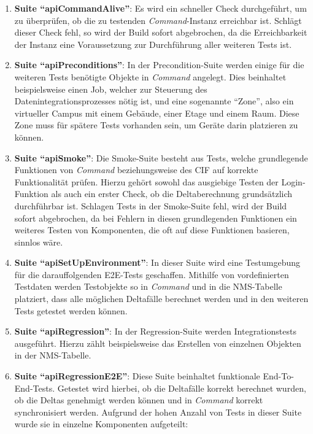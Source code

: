\begin{enumerate}
    \item \textbf{Suite \enquote{apiCommandAlive}}: Es wird ein schneller Check durchgeführt, um zu überprüfen, ob die zu testenden \textit{Command}-Instanz erreichbar ist. Schlägt dieser Check fehl, so wird der Build sofort abgebrochen, da die Erreichbarkeit der Instanz eine Voraussetzung zur Durchführung aller weiteren Tests ist.
    \item \textbf{Suite \enquote{apiPreconditions}}: In der Precondition-Suite werden einige für die weiteren Tests benötigte Objekte in \textit{Command} angelegt. Dies beinhaltet beispielsweise einen Job, welcher zur Steuerung des Datenintegrationsprozesses nötig ist, und eine sogenannte \enquote{Zone}, also ein virtueller Campus mit einem Gebäude, einer Etage und einem Raum. Diese Zone muss für spätere Tests vorhanden sein, um Geräte darin platzieren zu können.
    \item \textbf{Suite \enquote{apiSmoke}}: Die Smoke-Suite besteht aus Tests, welche grundlegende Funktionen von \textit{Command} beziehungsweise des \ac{CIF} auf korrekte Funktionalität prüfen. Hierzu gehört sowohl das ausgiebige Testen der Login-Funktion als auch ein erster Check, ob die Deltaberechnung grundsätzlich durchführbar ist. Schlagen Tests in der Smoke-Suite fehl, wird der Build sofort abgebrochen, da bei Fehlern in diesen grundlegenden Funktionen ein weiteres Testen von Komponenten, die oft auf diese Funktionen basieren, sinnlos wäre.
    \item \textbf{Suite \enquote{apiSetUpEnvironment}}: In dieser Suite wird eine Testumgebung für die darauffolgenden \ac{E2E}-Tests geschaffen. Mithilfe von vordefinierten Testdaten werden Testobjekte so in \textit{Command} und in die \ac{NMS}-Tabelle platziert, dass alle möglichen Deltafälle berechnet werden und in den weiteren Tests getestet werden können.
    \item \textbf{Suite \enquote{apiRegression}}: In der Regression-Suite werden Integrationstests ausgeführt. Hierzu zählt beispielsweise das Erstellen von einzelnen Objekten in der \ac{NMS}-Tabelle.
    \item \textbf{Suite \enquote{apiRegressionE2E}}: Diese Suite beinhaltet funktionale End-To-End-Tests. Getestet wird hierbei, ob die Deltafälle korrekt berechnet wurden, ob die Deltas genehmigt werden können und in \textit{Command} korrekt synchronisiert werden. Aufgrund der hohen Anzahl von Tests in dieser Suite wurde sie in einzelne Komponenten aufgeteilt:
    \begin{description}

\end{description}
\end{enumerate}
